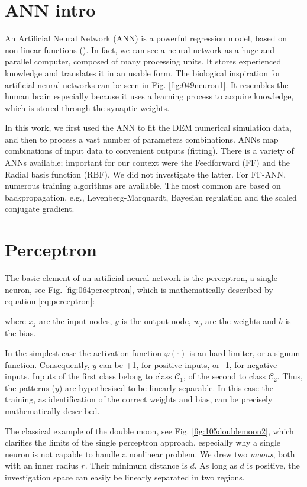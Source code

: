 \section{ANN intro}
\label{sec:annintro}
An Artificial Neural Network (\acs{ANN}) is a powerful regression model, 
based on non-linear functions (\citet{RefWorks:158}). 
In fact, we can see a neural network as a huge and parallel computer, composed
of many processing units. It stores experienced knowledge and translates it in
an usable form. 
The biological inspiration for artificial neural networks can be seen in Fig.
\ref{fig:049neuron1}. It resembles the human brain especially because it
uses a learning process to acquire knowledge, which is stored through the
synaptic weights.



In this work, we first used the \acs{ANN} to fit the \acs{DEM} numerical simulation
data, and then to process a vast number of parameters combinations. 
\acs{ANNs} map combinations of input data to convenient outputs (fitting). 
There is a variety of \acs{ANNs} available; important for our context were the
Feedforward (\acs{FF}) and the Radial basis function (\acs{RBF}). 
We did not investigate the latter.
For \acs{FF}-\acs{ANN},
numerous training algorithms are available. The most common are based on
backpropagation, e.g., Levenberg-Marquardt, Bayesian regulation and the scaled
conjugate gradient.

\section{Perceptron}
\label{sec:perceptron}

The basic element of an artificial neural network is the perceptron, a single
neuron, see Fig.
\ref{fig:064perceptron}, which is mathematically described by equation
\ref{eq:perceptron}: 

where $x_j$ are the input nodes, $y$ is the output node, $w_j$ are the weights
and $b$ is the bias.

In the simplest case  the activation function $\varphi(\cdot)$ is an hard
limiter, or a signum function.
Consequently, $y$ can be +1, for positive inputs, or -1, for negative inputs. Inputs of the first class
belong to class $\mathscr{C}_1$, of the second to class $\mathscr{C}_2$.
Thus, the patterns ($y$) are hypothesised to be linearly separable.
In this case the training, as identification of the correct weights and bias,
can be precisely mathematically described.

The classical example of the double moon, see Fig. \ref{fig:105doublemoon2},
which clarifies the limits of the single perceptron approach, especially 
why a single neuron is not capable to handle a
nonlinear problem.
We drew two \textit{moons}, both with an inner radius $r$. Their minimum
distance is $d$.
As long as $d$ is positive, the investigation space
can easily be linearly separated in two regions.


